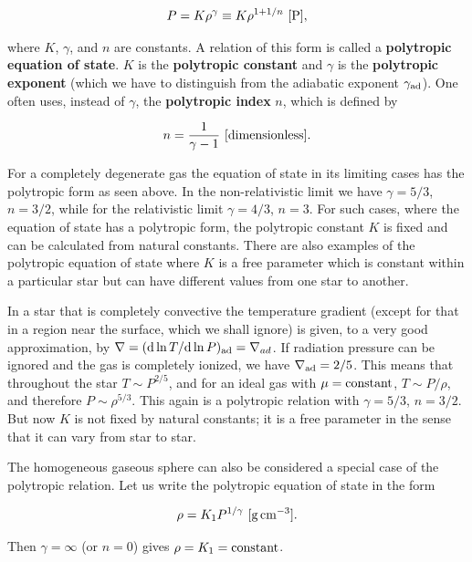 \documentclass[a4paper,10pt]{article}
\begin{document}
\begin{align*}
    P = K\rho^\gamma \equiv K\rho^{1+1/n} ~ [{\rm P}],
\end{align*}

{\noindent}where $K$, $\gamma$, and $n$ are constants. A relation of this form is called a \textbf{polytropic equation of state}. $K$ is the \textbf{polytropic constant} and $\gamma$ is the \textbf{polytropic exponent} (which we have to distinguish from the adiabatic exponent $\gamma_{\rm ad}$). One often uses, instead of $\gamma$, the \textbf{polytropic index} $n$, which is defined by

\begin{align*}
    n = \frac{1}{\gamma-1} ~ [{\rm dimensionless}].
\end{align*}

{\noindent}For a completely degenerate gas the equation of state in its limiting cases has the polytropic form as seen above. In the non-relativistic limit we have $\gamma=5/3$, $n=3/2$, while for the relativistic limit $\gamma=4/3$, $n=3$. For such cases, where the equation of state has a polytropic form, the polytropic constant $K$ is fixed and can be calculated from natural constants. There are also examples of the polytropic equation of state where $K$ is a free parameter which is constant within a particular star but can have different values from one star to another.

{\noindent}In a star that is completely convective the temperature gradient (except for that in a region near the surface, which we shall ignore) is given, to a very good approximation, by $\nabla=({\rm d}\ln T/{\rm d}\ln P)_{\rm ad}=\nabla_{ad}$. If radiation pressure can be ignored and the gas is completely ionized, we have $\nabla_{\rm ad}=2/5$. This means that throughout the star $T\sim P^{2/5}$, and for an ideal gas with $\mu={\rm constant}$, $T\sim P/\rho$, and therefore $P\sim\rho^{5/3}$. This again is a polytropic relation with  $\gamma=5/3$, $n=3/2$. But now $K$ is not fixed by natural constants; it is a free parameter in the sense that it can vary from star to star.

{\noindent}The homogeneous gaseous sphere can also be considered a special case of the polytropic relation. Let us write the polytropic equation of state in the form

\begin{align*}
    \rho = K_1P^{1/\gamma} ~ [{\rm g\,cm^{-3}}].
\end{align*}

{\noindent}Then $\gamma=\infty$ (or $n=0$) gives $\rho=K_1={\rm constant}$.
\end{document}
